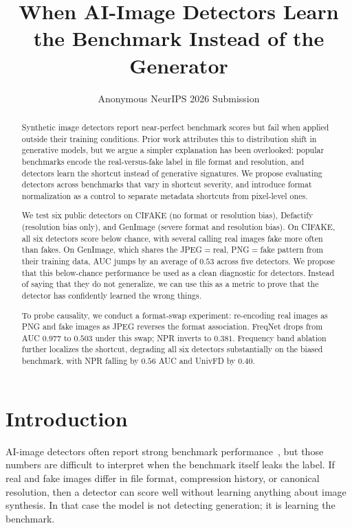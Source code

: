 \documentclass{article}
\title{When AI-Image Detectors Learn the Benchmark Instead of the Generator}
\author{Anonymous NeurIPS 2026 Submission}
\begin{document}
\maketitle

\begin{abstract}
Synthetic image detectors report near-perfect benchmark scores but fail when applied outside their training conditions.
Prior work attributes this to distribution shift in generative models, but we argue a simpler explanation has been overlooked: popular benchmarks encode the real-versus-fake label in file format and resolution, and detectors learn the shortcut instead of generative signatures.
We propose evaluating detectors across benchmarks that vary in shortcut severity, and introduce format normalization as a control to separate metadata shortcuts from pixel-level ones.

We test six public detectors on CIFAKE (no format or resolution bias), Defactify (resolution bias only), and GenImage (severe format and resolution bias).
On CIFAKE, all six detectors score below chance, with several calling real images fake more often than fakes.
On GenImage, which shares the JPEG$=$real, PNG$=$fake pattern from their training data, AUC jumps by an average of $0.53$ across five detectors. 
We propose that this below-chance performance be used as a clean diagnostic for detectors. Instead of saying that they do not generalize, we can use this as a metric to prove that the detector has confidently learned the wrong things.


To probe causality, we conduct a format-swap experiment: re-encoding real images as PNG and fake images as JPEG reverses the format association.
FreqNet drops from AUC $0.977$ to $0.503$ under this swap; NPR inverts to $0.381$.
Frequency band ablation further localizes the shortcut, degrading all six detectors substantially on the biased benchmark, with NPR falling by $0.56$ AUC and UnivFD by $0.40$.
\end{abstract}


\section{Introduction}
\label{sec:intro}

AI-image detectors often report strong benchmark performance~\cite{wang2020cnn,corvi2023intriguing,ricker2024aeroblade}, but those numbers are difficult to interpret when the benchmark itself leaks the label.
If real and fake images differ in file format, compression history, or canonical resolution, then a detector can score well without learning anything about image synthesis.
In that case the model is not detecting generation; it is learning the benchmark.
\end{document}
